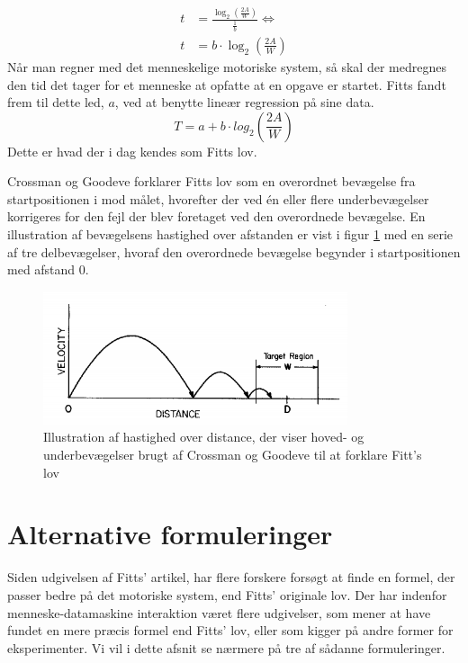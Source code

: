 \begin{align*}
t &= \frac{\log_2\left(\frac{2A}{W}\right)}{\frac{1}{b}} \Leftrightarrow\\ 
t &= b \cdot \log_2\left(\frac{2A}{W}\right)
\end{align*}
Når man regner med det menneskelige motoriske system, så skal der medregnes den tid det tager for et menneske at opfatte at en opgave er startet. Fitts fandt frem til dette led, $a$, ved at benytte lineær regression på sine data.
\begin{equation}
\label{eq:FittsLov}
T = a + b \cdot log_2\left(\frac{2A}{W}\right)
\end{equation}
Dette er hvad der i dag kendes som Fitts lov.

Crossman og Goodeve \cite{crossman1983} forklarer Fitts lov som en overordnet bevægelse fra startpositionen i mod målet, hvorefter der ved én eller flere underbevægelser korrigeres for den fejl der blev foretaget ved den overordnede bevægelse. En illustration af bevægelsens hastighed over afstanden er vist i figur \ref{fig:CrossmanFitt} med en serie af tre delbevægelser, hvoraf den overordnede bevægelse begynder i startpositionen med afstand 0.
\begin{figure}[h]
\centering
\includegraphics[width=.5\linewidth]{images/illustrations/base_model_fitt}
\caption{Illustration af hastighed over distance, der viser hoved- og underbevægelser brugt af Crossman og Goodeve til at forklare Fitt's lov \cite{meyer1988}}
\label{fig:CrossmanFitt}
\end{figure}

\newpage
{}
\section*{Alternative formuleringer}
Siden udgivelsen af Fitts’ artikel, har flere forskere forsøgt at finde en formel, der passer bedre på det motoriske system, end Fitts’ originale lov. Der har indenfor menneske-datamaskine interaktion været flere udgivelser, som mener at have fundet en mere præcis formel end Fitts’ lov, eller som kigger på andre former for eksperimenter. Vi vil i dette afsnit se nærmere på tre af sådanne formuleringer.

